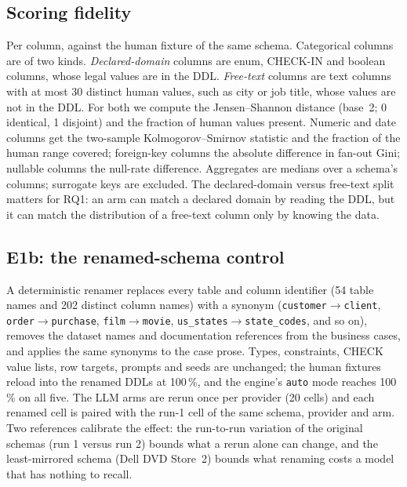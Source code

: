 \documentclass[preprint,12pt]{elsarticle}
\begin{document}
\subsection{Scoring fidelity}
\label{sec:fidmetrics}
Per column, against the human fixture of the same schema. Categorical columns are of two kinds. \emph{Declared-domain} columns are enum, CHECK-IN and boolean columns, whose legal values are in the DDL. \emph{Free-text} columns are text columns with at most 30 distinct human values, such as city or job title, whose values are not in the DDL. For both we compute the Jensen--Shannon distance (base~2; 0 identical, 1 disjoint) and the fraction of human values present. Numeric and date columns get the two-sample Kolmogorov--Smirnov statistic and the fraction of the human range covered; foreign-key columns the absolute difference in fan-out Gini; nullable columns the null-rate difference. Aggregates are medians over a schema's columns; surrogate keys are excluded. The declared-domain versus free-text split matters for RQ1: an arm can match a declared domain by reading the DDL, but it can match the distribution of a free-text column only by knowing the data.

\subsection{E1b: the renamed-schema control}
\label{sec:e1bdesign}
A deterministic renamer replaces every table and column identifier (54 table names and 202 distinct column names) with a synonym (\texttt{customer}$\to$\texttt{client}, \texttt{order}$\to$\texttt{purchase}, \texttt{film}$\to$\texttt{movie}, \texttt{us\_states}$\to$\texttt{state\_codes}, and so on), removes the dataset names and documentation references from the business cases, and applies the same synonyms to the case prose. Types, constraints, CHECK value lists, row targets, prompts and seeds are unchanged; the human fixtures reload into the renamed DDLs at 100\,\%, and the engine's \texttt{auto} mode reaches 100\,\% on all five. The LLM arms are rerun once per provider (20 cells) and each renamed cell is paired with the run-1 cell of the same schema, provider and arm. Two references calibrate the effect: the run-to-run variation of the original schemas (run 1 versus run 2) bounds what a rerun alone can change, and the least-mirrored schema (Dell DVD Store~2) bounds what renaming costs a model that has nothing to recall.
\end{document}
